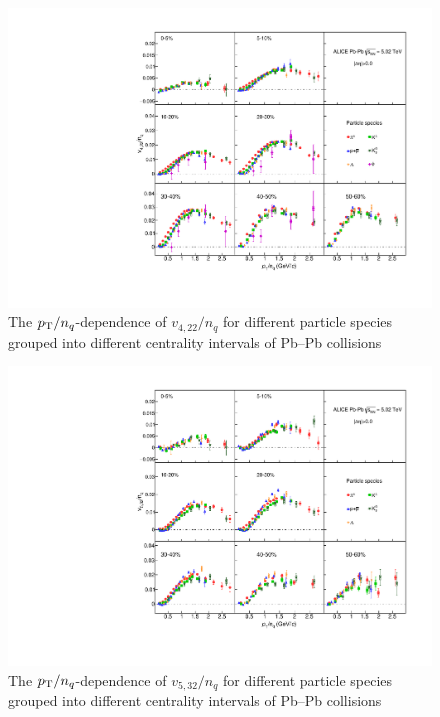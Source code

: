 \documentclass[ALICE,manyauthors]{cernphprep}
\providecommand{\DIFaddbeginFL}{} %
\providecommand{\DIFaddendFL}{} %
\providecommand{\DIFdelbeginFL}{} %
\providecommand{\DIFdelendFL}{} %
\begin{document}
\begin{figure}[!htb]
\begin{center}
\DIFdelbeginFL %
\DIFdelendFL %
\DIFaddbeginFL \includegraphics[scale=0.82]{figures/scaling/All_v422_gap00_NCQ_3by3.pdf}
\DIFaddendFL \end{center}
\caption{The $p_{\rm{T}}/n_{q}$-dependence of $v_{4,22}/n_{q}$ for different particle species grouped into different centrality intervals of Pb--Pb collisions \sNN}
\label{v422_NCQ}
\end{figure}

\begin{figure}[!htb]
\begin{center}
\DIFdelbeginFL %
\DIFdelendFL %
\DIFaddbeginFL \includegraphics[scale=0.82]{figures/scaling/All_v523_gap00_NCQ_3by3.pdf}

\DIFaddendFL \end{center}
\caption{The $p_{\rm{T}}/n_{q}$-dependence of $v_{5,32}/n_{q}$ for different particle species grouped into different centrality intervals of Pb--Pb collisions \sNN}
\label{v523_NCQ}
\end{figure}
\end{document}
